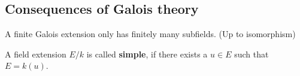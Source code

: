 \subsection{Consequences of Galois theory}


\begin{prop}[]
  A finite Galois extension only has finitely many subfields. (Up to isomorphism)
\end{prop}

\begin{dfn}[]
  A field extension $E/k$ is called \textbf{simple}, if there exists a $u \in E$ such that $E = k(u)$.
\end{dfn}

